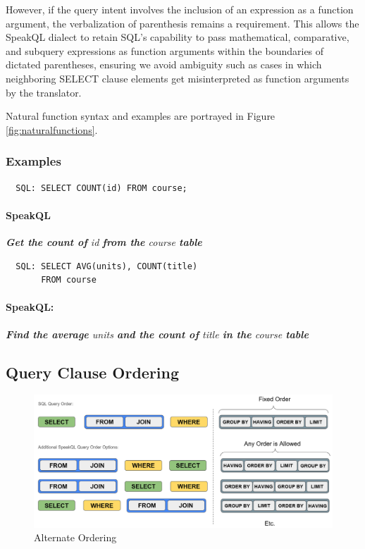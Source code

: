 However, if the query intent involves the inclusion of an expression as a function argument, the verbalization of parenthesis remains a requirement. This allows the SpeakQL dialect to retain SQL's capability to pass mathematical, comparative, and subquery expressions as function arguments within the boundaries of dictated parentheses, ensuring we avoid ambiguity such as cases in which neighboring SELECT clause elements get misinterpreted as function arguments by the translator.

Natural function syntax and examples are portrayed in Figure \ref{fig:naturalfunctions}.


\subsubsection{\textbf{Examples}}

\begin{verbatim}
  SQL: SELECT COUNT(id) FROM course;
\end{verbatim}
\paragraph{SpeakQL} \emph{\textbf{Get the count of} id \textbf{from the} course  \textbf{table}}

\vspace{2mm}
\begin{verbatim}
  SQL: SELECT AVG(units), COUNT(title)
       FROM course
\end{verbatim}
\paragraph{SpeakQL:} \emph{\textbf{Find the average} units \textbf{and the count of} title \textbf{in the} course \textbf{table}}



\subsection{Query Clause Ordering}

\begin{figure}[H]
  \centering
  \includegraphics[width=0.6\linewidth]{figures/alternate_ordering.png}
  \caption{Alternate Ordering}
  \label{fig:alternate_ordering}
\end{figure}

